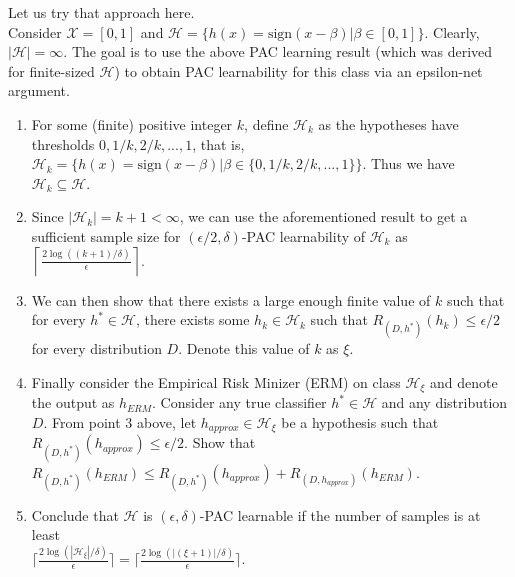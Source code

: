 Let us try that approach here.\\
Consider $\mathcal{X} = [0,1]$ and $\mathcal{H} = \{ h(x) = \text{sign}(x-\beta) | \beta \in [0,1]\}$. Clearly, $|\mathcal{H}|=\infty$. The goal is to use the above PAC learning result (which was derived for finite-sized $\mathcal{H}$) to obtain PAC learnability for this class via an epsilon-net argument.
\begin{enumerate}
    \item For some (finite) positive integer $k$, define $\mathcal{H}_k$ as the hypotheses have thresholds $0, 1/k, 2/k, ..., 1$, that is, $\mathcal{H}_k = \{ h(x) = \text{sign}(x-\beta) | \beta \in \{0, 1/k, 2/k, ..., 1\}\}$. Thus we have  $\mathcal{H}_k \subseteq \mathcal{H}$. 
    \item Since $|\mathcal{H}_k|=k+1 < \infty$, we can use the aforementioned result to get a sufficient sample size for $(\epsilon/2,\delta)$-PAC learnability of ${\mathcal{H}_k}$ as   $\left \lceil{\frac{2 \log((k+1)/\delta)}{\epsilon}}\right \rceil $.
    \item We can then show that there exists a large enough finite value of $k$ such that for every $h^* \in \mathcal{H}$, there exists some $h_k \in \mathcal{H}_k$ such that $R_{(D,h^*)}(h_k) \leq \epsilon/2$ for every distribution $D$. Denote this value of $k$ as $\xi$. 
    \item Finally consider the Empirical Risk Minizer (ERM) on class $\mathcal{H}_\xi$ and denote the output as $h_{ERM}$. Consider any true classifier $h^* \in \mathcal{H}$ and any distribution $D$. From point 3 above, let $h_{approx} \in \mathcal{H}_\xi$ be a hypothesis such that $R_{(D,h^*)}(h_{approx}) \leq \epsilon/2$. Show that $R_{(D,h^*)}(h_{ERM}) \leq R_{(D,h^*)}(h_{approx}) +     R_{(D,h_{approx})}(h_{ERM})$.
    \item Conclude that $\mathcal{H}$ is $(\epsilon,\delta)$-PAC learnable if the number of samples is at least\\ $\lceil \frac{2\log(|\mathcal{H}_{\xi}|/\delta)}{\epsilon} \rceil = \lceil\frac{2\log(|(\xi+1)|/\delta)}{\epsilon} \rceil$.
\end{enumerate}


